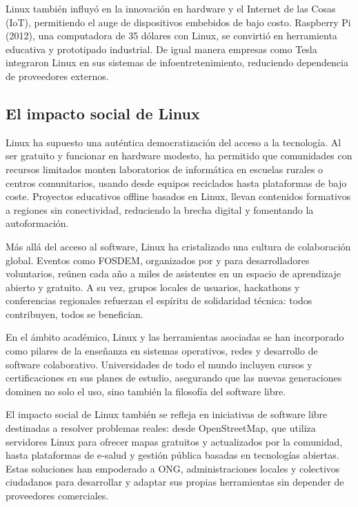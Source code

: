 \documentclass[a4paper,12pt]{article}
\begin{document}
Linux también influyó en la innovación en hardware y el Internet de las Cosas (IoT), permitiendo el 
auge de dispositivos embebidos de bajo costo. Raspberry Pi (2012), una computadora de 35 dólares con 
Linux, se convirtió en herramienta educativa y prototipado industrial. De igual manera empresas como 
Tesla integraron Linux en sus sistemas de infoentretenimiento, reduciendo dependencia de proveedores 
externos. 

\subsection{El impacto social de Linux}

Linux ha supuesto una auténtica democratización del acceso a la tecnología. Al ser gratuito 
y funcionar en hardware modesto, ha permitido que comunidades con recursos limitados monten 
laboratorios de informática en escuelas rurales o centros comunitarios, usando desde equipos 
reciclados hasta plataformas de bajo coste. Proyectos educativos offline basados en Linux, 
llevan contenidos formativos a regiones sin conectividad, reduciendo la brecha digital y 
fomentando la autoformación.

Más allá del acceso al software, Linux ha cristalizado una cultura de colaboración global. 
Eventos como FOSDEM, organizados por y para desarrolladores voluntarios, reúnen cada año a 
miles de asistentes en un espacio de aprendizaje abierto y gratuito. A su vez, grupos locales 
de usuarios, hackathons y conferencias regionales refuerzan el espíritu de solidaridad técnica: 
todos contribuyen, todos se benefician.

En el ámbito académico, Linux y las herramientas asociadas se han incorporado como pilares de 
la enseñanza en sistemas operativos, redes y desarrollo de software colaborativo. Universidades 
de todo el mundo incluyen cursos y certificaciones en sus planes de estudio, asegurando que las 
nuevas generaciones dominen no solo el uso, sino también la filosofía del software libre.

El impacto social de Linux también se refleja en iniciativas de software libre destinadas a 
resolver problemas reales: desde OpenStreetMap, que utiliza servidores Linux para ofrecer mapas 
gratuitos y actualizados por la comunidad, hasta plataformas de e-salud y gestión pública basadas 
en tecnologías abiertas. Estas soluciones han empoderado a ONG, administraciones locales y colectivos 
ciudadanos para desarrollar y adaptar sus propias herramientas sin depender de proveedores comerciales.
\end{document}
